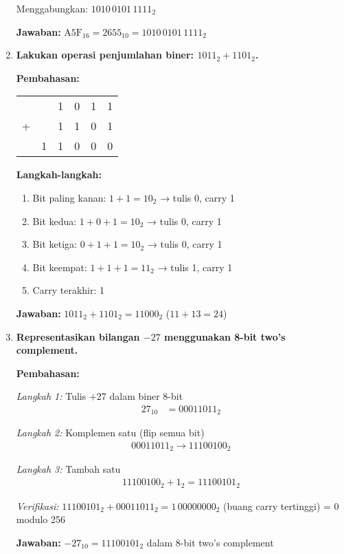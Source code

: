\documentclass[../main.tex]{subfiles}
\begin{document}
\begin{enumerate}
    Menggabungkan: \(1010\,0101\,1111_2\)
    
    \textbf{Jawaban:} \(\mathrm{A5F}_{16} = 2655_{10} = 1010\,0101\,1111_2\)

    \item \textbf{Lakukan operasi penjumlahan biner: \(1011_2 + 1101_2\).}
    
    \textbf{Pembahasan:}
    
    \begin{center}
    \begin{tabular}{cccccc}
      &   & 1 & 0 & 1 & 1 \\
    + &   & 1 & 1 & 0 & 1 \\
    \hline
      & 1 & 1 & 0 & 0 & 0 \\
    \end{tabular}
    \end{center}
    
    \textbf{Langkah-langkah:}
    \begin{enumerate}
        \item Bit paling kanan: \(1 + 1 = 10_2\) → tulis 0, carry 1
        \item Bit kedua: \(1 + 0 + 1 = 10_2\) → tulis 0, carry 1
        \item Bit ketiga: \(0 + 1 + 1 = 10_2\) → tulis 0, carry 1
        \item Bit keempat: \(1 + 1 + 1 = 11_2\) → tulis 1, carry 1
        \item Carry terakhir: 1
    \end{enumerate}
    
    \textbf{Jawaban:} \(1011_2 + 1101_2 = 11000_2\) (\(11 + 13 = 24\))

    \item \textbf{Representasikan bilangan \(-27\) menggunakan 8-bit two's complement.}
    
    \textbf{Pembahasan:}
    
    \textit{Langkah 1:} Tulis \(+27\) dalam biner 8-bit
    \begin{align*}
    27_{10} &= 00011011_2
    \end{align*}
    
    \textit{Langkah 2:} Komplemen satu (flip semua bit)
    \begin{align*}
    00011011_2 \rightarrow 11100100_2
    \end{align*}
    
    \textit{Langkah 3:} Tambah satu
    \begin{align*}
    11100100_2 + 1_2 = 11100101_2
    \end{align*}
    
    \textit{Verifikasi:} \(11100101_2 + 00011011_2 = 1\,00000000_2\) (buang carry tertinggi) = \(0\) modulo 256
    
    \textbf{Jawaban:} \(-27_{10} = 11100101_2\) dalam 8-bit two's complement
\end{enumerate}
\end{document}
